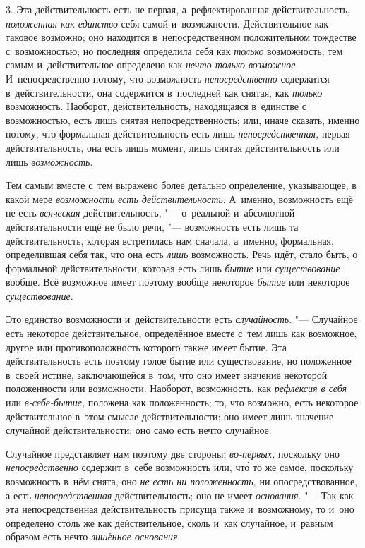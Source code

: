 3. Эта действительность есть не первая, а~рефлектированная действительность,
{\em положенная как единство} себя самой и~возможности.
Действительное как таковое возможно; оно находится в~непосредственном
положительном тождестве с~возможностью; но последняя определила себя как
{\em только} возможность; тем самым и~действительное
определено как {\em нечто только возможное}.
И~непосредственно потому, что возможность
{\em непосредственно} содержится в~действительности,
она содержится в~последней как снятая, как {\em только}
возможность. Наоборот, действительность, находящаяся в~единстве с
возможностью, есть лишь снятая непосредственность; или, иначе сказать,
именно потому, что формальная действительность есть лишь
{\em непосредственная,} первая действительность, она
есть лишь момент, лишь снятая действительность или лишь
{\em возможность}.

Тем самым вместе с~тем выражено более детально определение, указывающее, в
какой мере {\em возможность есть действительность}.
А~именно, возможность ещё не есть {\em всяческая}
действительность, "--- о~реальной и~абсолютной действительности ещё не было
речи, "--- возможность есть лишь та действительность, которая встретилась нам
сначала, а~именно, формальная, определившая себя так, что она есть
{\em лишь} возможность. Речь идёт, стало быть, о
формальной действительности, которая есть лишь
{\em бытие} или {\em существование}
вообще. Всё возможное имеет поэтому вообще некоторое
{\em бытие} или некоторое
{\em существование}.

Это единство возможности и~действительности есть
{\em случайность}. "--- Случайное есть некоторое
действительное, определённое вместе с~тем лишь как возможное, другое или
противоположность которого также имеет бытие. Эта действительность есть
поэтому голое бытие или существование, но положенное в~своей истине,
заключающейся в~том, что оно имеет значение некоторой положенности или
возможности. Наоборот, возможность, как {\em рефлексия
в себя} или {\em в-себе-бытие,} положена как
положенность; то, что возможно, есть некоторое действительное в~этом смысле
действительности; оно имеет лишь значение случайной действительности; оно
само есть нечто случайное.

Случайное представляет нам поэтому две стороны;
{\em во-первых,} поскольку оно
{\em непосредственно} содержит в~себе возможность или,
чт\'{о} то же самое, поскольку возможность в~нём снята, оно
{\em не есть ни положенность,} ни опосредствованное, а
есть {\em непосредственная} действительность; оно не
имеет {\em основания}. "--- Так как эта непосредственная
действительность присуща также и~возможному, то и~оно определено столь же
как действительное, сколь и~как случайное, и~равным образом есть нечто
{\em лишённое основания}.

